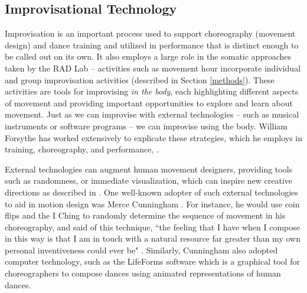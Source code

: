 \documentclass[arts,article,submit,moreauthors,pdftex,10pt,a4paper]{mdpi}
\begin{document}
\subsection{Improvisational Technology}

Improvisation is an important process used to support choreography (movement design) and dance training and utilized in performance that is distinct enough to be called out on its own. It also employs a large role in the somatic approaches taken by the RAD Lab -- activities such as movement hour incorporate individual and group improvisation activities (described in Section
\ref{methods}). These activities are tools for improvising \textit{in the body}, each highlighting different aspects of movement and providing important opportunities to explore and learn about movement. Just as we can improvise with external technologies -- such as musical instruments or software programs -- we can improvise using the body. 
William Forsythe has worked extensively to explicate these strategies, which he employs in training, choreography, and performance, \cite{forsythe2012improvisation}.

External technologies can augment human movement designers, providing tools such as randomness, or immediate visualization, which can inspire new creative directions as described in \cite{improvhand}.  One well-known adopter of such external technologies to aid in motion design was Merce Cunningham \cite{copeland2004merce}. For instance, he would use coin flips and the I Ching to randomly determine the sequence of movement in his choreography, and said of this technique, ``the feeling that I have when I compose in this way is that I
am in touch with a natural resource far greater than my own personal inventiveness could ever be" \cite{cunningham1997impermanent}. Similarly, Cunningham also adopted computer technology, such as the LifeForms
software \cite{calvert1993evolution,schiphorst1993case} which is a graphical tool for choreographers to compose dances using animated representations of human dances. 
\end{document}
